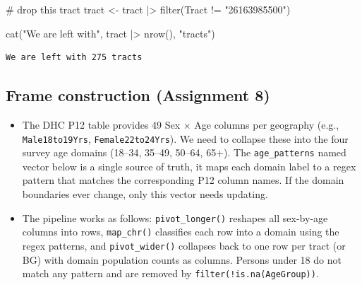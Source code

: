 \documentclass[
  11pt,
]{article}
\newenvironment{Shaded}{\begin{snugshade}}{\end{snugshade}}
\newcommand{\CommentTok}[1]{\textcolor[rgb]{0.37,0.37,0.37}{#1}}
\newcommand{\FunctionTok}[1]{\textcolor[rgb]{0.28,0.35,0.67}{#1}}
\newcommand{\NormalTok}[1]{\textcolor[rgb]{0.00,0.23,0.31}{#1}}
\newcommand{\OtherTok}[1]{\textcolor[rgb]{0.00,0.23,0.31}{#1}}
\newcommand{\SpecialCharTok}[1]{\textcolor[rgb]{0.37,0.37,0.37}{#1}}
\newcommand{\StringTok}[1]{\textcolor[rgb]{0.13,0.47,0.30}{#1}}
\begin{document}
\begin{Shaded}
\begin{Highlighting}[]
\CommentTok{\# drop this tract}
\NormalTok{tract }\OtherTok{\textless{}{-}}\NormalTok{ tract }\SpecialCharTok{|\textgreater{}} 
  \FunctionTok{filter}\NormalTok{(Tract }\SpecialCharTok{!=} \StringTok{"26163985500"}\NormalTok{)}

\FunctionTok{cat}\NormalTok{(}\StringTok{"We are left with"}\NormalTok{, tract }\SpecialCharTok{|\textgreater{}} \FunctionTok{nrow}\NormalTok{(), }\StringTok{"tracts"}\NormalTok{)}
\end{Highlighting}
\end{Shaded}

\begin{verbatim}
We are left with 275 tracts
\end{verbatim}

\newpage

\subsection{Frame construction (Assignment
8)}\label{frame-construction-assignment-8}

\begin{itemize}
\item
  The DHC P12 table provides 49 Sex \(\times\) Age columns per geography
  (e.g., \texttt{Male18to19Yrs}, \texttt{Female22to24Yrs}). We need to
  collapse these into the four survey age domains (18--34, 35--49,
  50--64, 65+). The \texttt{age\_patterns} named vector below is a
  single source of truth, it maps each domain label to a regex pattern
  that matches the corresponding P12 column names. If the domain
  boundaries ever change, only this vector needs updating.
\item
  The pipeline works as follows: \texttt{pivot\_longer()} reshapes all
  sex-by-age columns into rows, \texttt{map\_chr()} classifies each row
  into a domain using the regex patterns, and \texttt{pivot\_wider()}
  collapses back to one row per tract (or BG) with domain population
  counts as columns. Persons under 18 do not match any pattern and are
  removed by \texttt{filter(!is.na(AgeGroup))}.
\end{itemize}
\end{document}
